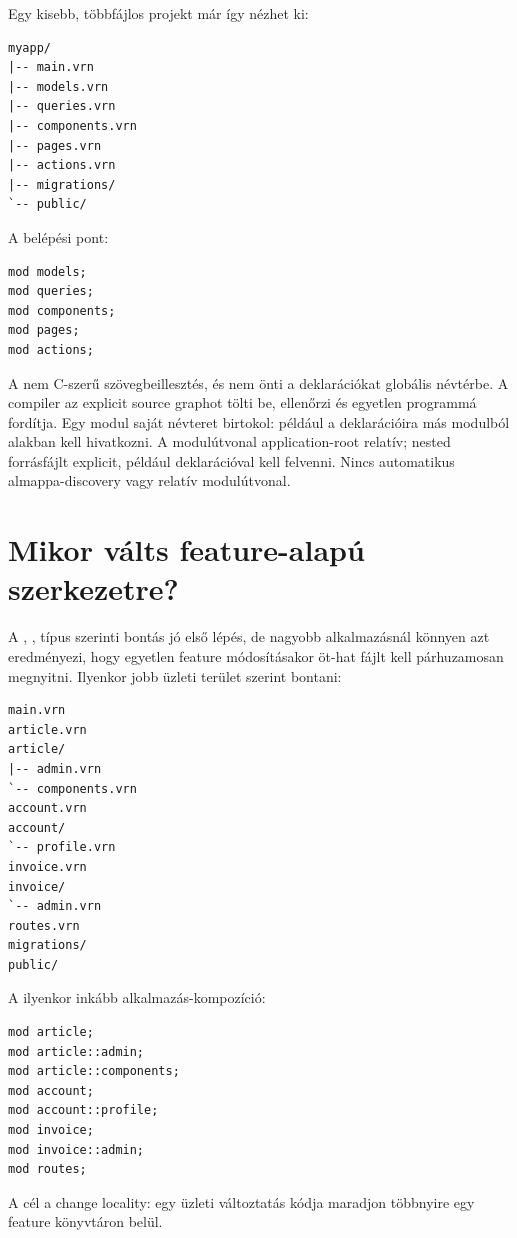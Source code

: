 Egy kisebb, többfájlos projekt már így nézhet ki:

\begin{lstlisting}
myapp/
|-- main.vrn
|-- models.vrn
|-- queries.vrn
|-- components.vrn
|-- pages.vrn
|-- actions.vrn
|-- migrations/
`-- public/
\end{lstlisting}

A belépési pont:

\begin{lstlisting}[language=Velran]
mod models;
mod queries;
mod components;
mod pages;
mod actions;
\end{lstlisting}

A  nem C-szerű szövegbeillesztés, és nem önti a deklarációkat globális névtérbe. A compiler az explicit source graphot tölti be, ellenőrzi és egyetlen programmá fordítja. Egy modul saját névteret birtokol: például a  deklarációira más modulból  alakban kell hivatkozni. A modulútvonal application-root relatív; nested forrásfájlt explicit, például  deklarációval kell felvenni. Nincs automatikus almappa-discovery vagy relatív  modulútvonal.

\section{Mikor válts feature-alapú szerkezetre?}

A , ,  típus szerinti bontás jó első lépés, de nagyobb alkalmazásnál könnyen azt eredményezi, hogy egyetlen feature módosításakor öt-hat fájlt kell párhuzamosan megnyitni. Ilyenkor jobb üzleti terület szerint bontani:

\begin{lstlisting}
main.vrn
article.vrn
article/
|-- admin.vrn
`-- components.vrn
account.vrn
account/
`-- profile.vrn
invoice.vrn
invoice/
`-- admin.vrn
routes.vrn
migrations/
public/
\end{lstlisting}

A  ilyenkor inkább alkalmazás-kompozíció:

\begin{lstlisting}[language=Velran]
mod article;
mod article::admin;
mod article::components;
mod account;
mod account::profile;
mod invoice;
mod invoice::admin;
mod routes;
\end{lstlisting}

A cél a change locality: egy üzleti változtatás kódja maradjon többnyire egy feature könyvtáron belül.

